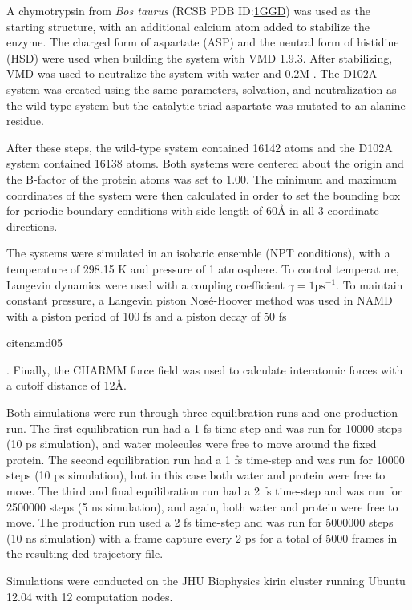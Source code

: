\documentclass[12pt, twocolumn]{article}
\newcommand*{\nolink}[1]{%
\begin{NoHyper}#1\end{NoHyper}%
}
\begin{document}
A chymotrypsin from \textit{Bos taurus}
(RCSB PDB ID:\@ \href{http://www.rcsb.org/pdb/explore.do?structureId=1ggd}{1GGD})
was used as the starting structure, with an additional calcium atom added to
stabilize the enzyme. The charged form of aspartate (ASP) and the neutral form
of histidine (HSD) were used when building the system with VMD 1.9.3. After
stabilizing, VMD was used to neutralize the system with water and 0.2M .
The D102A system was created using the same parameters, solvation, and
neutralization as the wild-type system but the catalytic triad aspartate was
mutated to an alanine residue.

After these steps, the wild-type system contained 16142 atoms and the D102A
system contained 16138 atoms. Both systems were centered about the origin and
the B-factor of the protein atoms was set to 1.00. The minimum and maximum
coordinates of the system were then calculated in order to set the bounding
box for periodic boundary conditions with side length of 60\AA{} in all 3
coordinate directions.

The systems were simulated in an isobaric ensemble (NPT conditions), with a
temperature of 298.15 K and pressure of 1 atmosphere. To control temperature,
Langevin dynamics were used with a coupling coefficient
\(\gamma = 1 \mathrm{ps}^{-1}\). To maintain constant pressure, a Langevin
piston Nos\'e-Hoover method was used in NAMD with a piston period of
100 fs and a piston decay of 50 fs~\nolink{cite{namd05}}. Finally, the CHARMM
force field was used to calculate interatomic forces with a cutoff distance
of 12\AA{}.

Both simulations were run through three equilibration runs and one production
run. The first equilibration run had a 1 fs time-step and was run for 10000
steps (10 ps simulation), and water molecules were free to move around the
fixed protein.
The second equilibration run had a 1 fs time-step and was run for 10000 steps
(10 ps simulation), but in this case both water and protein were free to move.
The third and final equilibration run had a 2 fs time-step and was run for
2500000 steps (5 ns simulation), and again, both water and protein were free
to move.
The production run used a 2 fs time-step and was run for 5000000 steps (10 ns
simulation) with a frame capture every 2 ps for a total of 5000 frames in the
resulting dcd trajectory file.

Simulations were conducted on the JHU Biophysics kirin cluster running Ubuntu
12.04 with 12 computation nodes.
\end{document}
